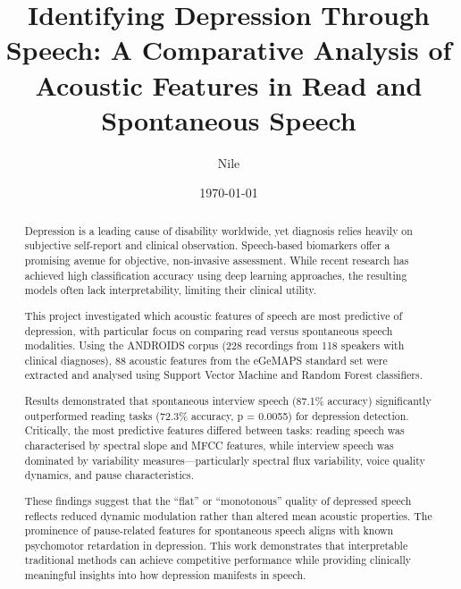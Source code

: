 \documentclass{l4proj}
\begin{document}
\title{Identifying Depression Through Speech: A Comparative Analysis of Acoustic Features in Read and Spontaneous Speech}
\author{Nile}
\date{\today}

\maketitle

\begin{abstract}
Depression is a leading cause of disability worldwide, yet diagnosis relies heavily on subjective self-report and clinical observation. Speech-based biomarkers offer a promising avenue for objective, non-invasive assessment. While recent research has achieved high classification accuracy using deep learning approaches, the resulting models often lack interpretability, limiting their clinical utility.

This project investigated which acoustic features of speech are most predictive of depression, with particular focus on comparing read versus spontaneous speech modalities. Using the ANDROIDS corpus (228 recordings from 118 speakers with clinical diagnoses), 88 acoustic features from the eGeMAPS standard set were extracted and analysed using Support Vector Machine and Random Forest classifiers.

Results demonstrated that spontaneous interview speech (87.1\% accuracy) significantly outperformed reading tasks (72.3\% accuracy, p = 0.0055) for depression detection. Critically, the most predictive features differed between tasks: reading speech was characterised by spectral slope and MFCC features, while interview speech was dominated by variability measures—particularly spectral flux variability, voice quality dynamics, and pause characteristics.

These findings suggest that the ``flat'' or ``monotonous'' quality of depressed speech reflects reduced dynamic modulation rather than altered mean acoustic properties. The prominence of pause-related features for spontaneous speech aligns with known psychomotor retardation in depression. This work demonstrates that interpretable traditional methods can achieve competitive performance while providing clinically meaningful insights into how depression manifests in speech.
\end{abstract}
\end{document}
